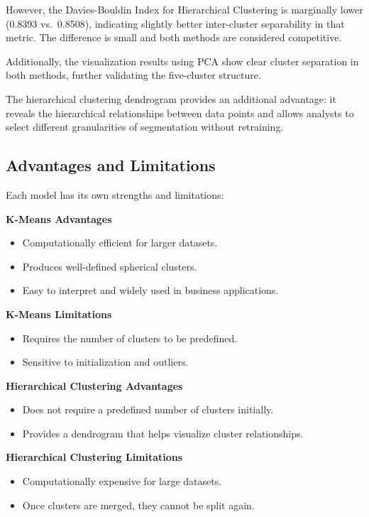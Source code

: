 \documentclass[12pt,a4paper]{article}
\begin{document}
However, the Davies-Bouldin Index for Hierarchical Clustering is marginally lower (0.8393 vs.\ 0.8508), indicating slightly better inter-cluster separability in that metric. The difference is small and both methods are considered competitive.

Additionally, the visualization results using PCA show clear cluster separation in both methods, further validating the five-cluster structure.

The hierarchical clustering dendrogram provides an additional advantage: it reveals the hierarchical relationships between data points and allows analysts to select different granularities of segmentation without retraining.

\subsection{Advantages and Limitations}

Each model has its own strengths and limitations:

\textbf{K-Means Advantages}

\begin{itemize}
    \item Computationally efficient for larger datasets.
    \item Produces well-defined spherical clusters.
    \item Easy to interpret and widely used in business applications.
\end{itemize}

\textbf{K-Means Limitations}

\begin{itemize}
    \item Requires the number of clusters to be predefined.
    \item Sensitive to initialization and outliers.
\end{itemize}

\textbf{Hierarchical Clustering Advantages}

\begin{itemize}
    \item Does not require a predefined number of clusters initially.
    \item Provides a dendrogram that helps visualize cluster relationships.
\end{itemize}

\textbf{Hierarchical Clustering Limitations}

\begin{itemize}
    \item Computationally expensive for large datasets.
    \item Once clusters are merged, they cannot be split again.
\end{itemize}
\end{document}
